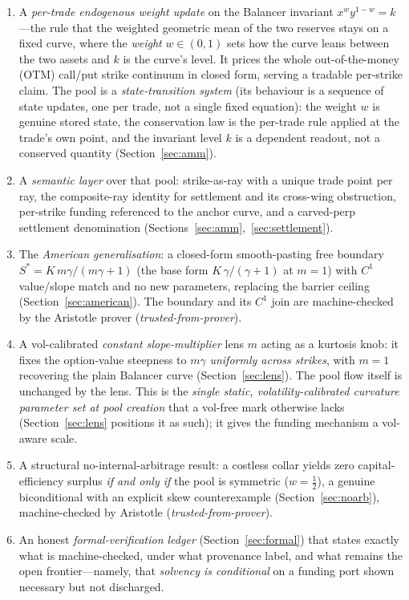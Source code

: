 \documentclass[11pt]{article}
\newcommand{\tfp}{\emph{trusted-from-prover}}
\begin{document}
\begin{enumerate}[leftmargin=2em]
  \item A \emph{per-trade endogenous weight update} on the Balancer invariant
        $x^{w}y^{1-w}=k$---the rule that the weighted geometric mean of the two
        reserves stays on a fixed curve, where the \emph{weight} $w\in(0,1)$ sets
        how the curve leans between the two assets and $k$ is the curve's level.
        It prices the whole out-of-the-money (OTM) call/put strike continuum in
        closed form, serving a tradable per-strike claim. The pool is a
        \emph{state-transition system} (its behaviour is a sequence of state
        updates, one per trade, not a single fixed equation): the weight $w$ is
        genuine stored state, the conservation law is the per-trade rule applied at
        the trade's own point, and the invariant level $k$ is a dependent readout,
        not a conserved quantity (Section~\ref{sec:amm}).
  \item A \emph{semantic layer} over that pool: strike-as-ray with a unique
        trade point per ray, the composite-ray identity for settlement and its
        cross-wing obstruction, per-strike funding referenced to the anchor
        curve, and a carved-perp settlement denomination
        (Sections~\ref{sec:amm},~\ref{sec:settlement}).
  \item The \emph{American generalisation}: a closed-form smooth-pasting free
        boundary $S^{\ast}=K\,m\gamma/(m\gamma+1)$ (the base form
        $K\,\gamma/(\gamma+1)$ at $m=1$) with $C^{1}$ value/slope match
        and no new parameters, replacing the barrier ceiling
        (Section~\ref{sec:american}). The boundary and its $C^{1}$ join are
        machine-checked by the Aristotle prover (\tfp{}).
  \item A vol-calibrated \emph{constant slope-multiplier} lens $m$ acting as a
        kurtosis knob: it fixes the option-value steepness to $m\gamma$
        \emph{uniformly across strikes}, with $m=1$ recovering the plain
        Balancer curve (Section~\ref{sec:lens}). The pool flow itself is
        unchanged by the lens. This is the \emph{single static,
        volatility-calibrated curvature parameter set at pool creation} that a
        vol-free mark otherwise lacks (Section~\ref{sec:lens} positions it as
        such); it gives the funding mechanism a vol-aware scale.
  \item A structural no-internal-arbitrage result: a costless collar yields zero
        capital-efficiency surplus \emph{if and only if} the pool is symmetric
        ($w=\tfrac12$), a genuine biconditional with an explicit skew
        counterexample (Section~\ref{sec:noarb}), machine-checked by Aristotle
        (\tfp{}).
  \item An honest \emph{formal-verification ledger} (Section~\ref{sec:formal})
        that states exactly what is machine-checked, under what provenance label,
        and what remains the open frontier---namely, that \emph{solvency is
        conditional} on a funding port shown necessary but not discharged.
\end{enumerate}
\end{document}
